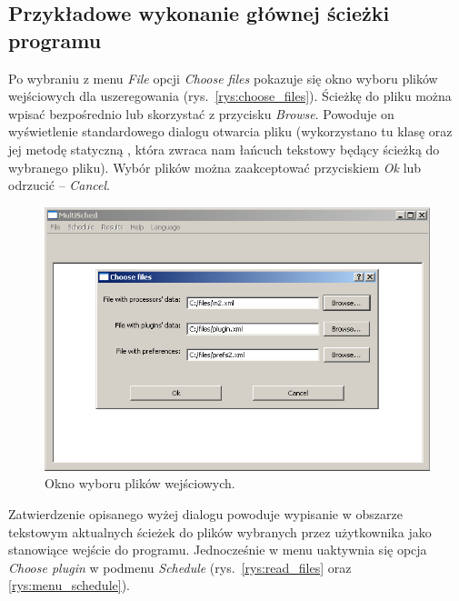 \subsection{Przykładowe wykonanie głównej ścieżki programu}

Po wybraniu z menu \emph{File} opcji \emph{Choose files} pokazuje się okno wyboru plików wejściowych dla uszeregowania (rys.~\vref{rys:choose_files}).
Ścieżkę do pliku można wpisać bezpośrednio lub skorzystać z przycisku \emph{Browse}. Powoduje on wyświetlenie 
standardowego dialogu otwarcia pliku (wykorzystano tu klasę  oraz jej metodę statyczną , która zwraca 
nam łańcuch tekstowy będący ścieżką do wybranego pliku). Wybór plików można zaakceptować przyciskiem \emph{Ok} lub odrzucić -- \emph{Cancel}.

\begin{figure}[htp]
\centering\includegraphics[scale=0.8]{figures/screens/choose_files.png}
\caption{Okno wyboru plików wejściowych.}\label{rys:choose_files}
\end{figure}

Zatwierdzenie opisanego wyżej dialogu powoduje wypisanie w obszarze tekstowym aktualnych ścieżek do plików wybranych przez użytkownika jako stanowiące 
wejście do programu. Jednocześnie w menu uaktywnia się opcja \emph{Choose plugin} w podmenu \emph{Schedule} (rys.~\vref{rys:read_files} oraz 
\vref{rys:menu_schedule}).

